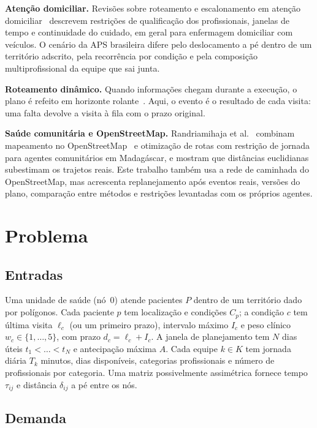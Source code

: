 \documentclass[conference,a4paper]{IEEEtran}
\begin{document}
\textbf{Atenção domiciliar.} Revisões sobre roteamento e escalonamento em atenção domiciliar~\cite{fikar2017,cisse2017} descrevem restrições de qualificação dos profissionais, janelas de tempo e continuidade do cuidado, em geral para enfermagem domiciliar com veículos. O cenário da APS brasileira difere pelo deslocamento a pé dentro de um território adscrito, pela recorrência por condição e pela composição multiprofissional da equipe que sai junta.

\textbf{Roteamento dinâmico.} Quando informações chegam durante a execução, o plano é refeito em horizonte rolante~\cite{pillac2013}. Aqui, o evento é o resultado de cada visita: uma falta devolve a visita à fila com o prazo original.

\textbf{Saúde comunitária e OpenStreetMap.} Randriamihaja et al.~\cite{randriamihaja2024} combinam mapeamento no OpenStreetMap~\cite{haklay2008} e otimização de rotas com restrição de jornada para agentes comunitários em Madagáscar, e mostram que distâncias euclidianas subestimam os trajetos reais. Este trabalho também usa a rede de caminhada do OpenStreetMap, mas acrescenta replanejamento após eventos reais, versões do plano, comparação entre métodos e restrições levantadas com os próprios agentes.

\section{Problema}\label{sec:problema}

\subsection{Entradas}

Uma unidade de saúde (nó~0) atende pacientes $P$ dentro de um território dado por polígonos. Cada paciente $p$ tem localização e condições $C_p$; a condição $c$ tem última visita $\ell_c$ (ou um primeiro prazo), intervalo máximo $I_c$ e peso clínico $w_c \in \{1,\dots,5\}$, com prazo $d_c = \ell_c + I_c$. A janela de planejamento tem $N$ dias úteis $t_1 < \dots < t_N$ e antecipação máxima $A$. Cada equipe $k \in K$ tem jornada diária $T_k$ minutos, dias disponíveis, categorias profissionais e número de profissionais por categoria. Uma matriz possivelmente assimétrica fornece tempo $\tau_{ij}$ e distância $\delta_{ij}$ a pé entre os nós.

\subsection{Demanda}
\end{document}
